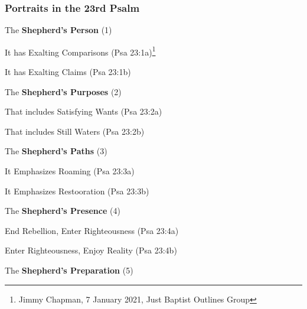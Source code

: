 \subsubsection{Portraits in the 23rd Psalm}


\begin{compactenum}[I.]
    \item The \textbf{Shepherd's Person} (1)
    \begin{compactenum}[A.]
        \item It has Exalting Comparisons (Psa 23:1a)\footnote{Jimmy Chapman, 7 January 2021, Just Baptist Outlines Group}
        \item It has Exalting Claims (Psa 23:1b)
    \end{compactenum}
    \item The \textbf{Shepherd's Purposes} (2)
    \begin{compactenum}[A.]
        \item That includes Satisfying Wants (Psa 23:2a)
        \item That includes Still Waters (Psa 23:2b)
    \end{compactenum}
    \item The \textbf{Shepherd's Paths} (3)
     \begin{compactenum}[A.]
        \item It Emphasizes Roaming (Psa 23:3a)
        \item It Emphasizes Restooration (Psa 23:3b)
    \end{compactenum}
   \item The \textbf{Shepherd's Presence} (4)
     \begin{compactenum}[A.]
        \item End Rebellion, Enter Righteousness (Psa 23:4a)
        \item Enter Righteousness, Enjoy Reality (Psa 23:4b)
    \end{compactenum}
    \item The \textbf{Shepherd's Preparation} (5)

\end{compactenum}
